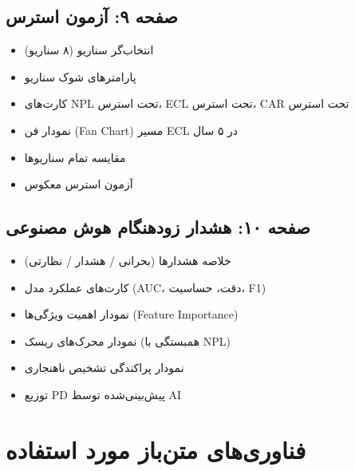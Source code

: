 \documentclass[12pt,a4paper]{article}
\begin{document}
\subsection{صفحه ۹: آزمون استرس}

\begin{itemize}
    \item انتخاب‌گر سناریو (۸ سناریو)
    \item پارامترهای شوک سناریو
    \item کارت‌های NPL تحت استرس، ECL تحت استرس، CAR تحت استرس
    \item نمودار فن (Fan Chart) مسیر ECL در ۵ سال
    \item مقایسه تمام سناریوها
    \item آزمون استرس معکوس
\end{itemize}

\subsection{صفحه ۱۰: هشدار زودهنگام هوش مصنوعی}

\begin{itemize}
    \item خلاصه هشدارها (بحرانی / هشدار / نظارتی)
    \item کارت‌های عملکرد مدل (AUC، دقت، حساسیت، F1)
    \item نمودار اهمیت ویژگی‌ها (Feature Importance)
    \item نمودار محرک‌های ریسک (همبستگی با NPL)
    \item نمودار پراکندگی تشخیص ناهنجاری
    \item توزیع PD پیش‌بینی‌شده توسط AI
\end{itemize}

\section{فناوری‌های متن‌باز مورد استفاده}
\end{document}
